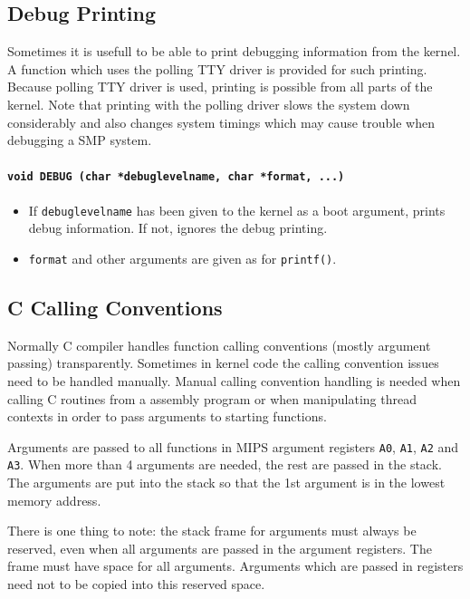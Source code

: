 \documentclass[twoside,a4paper]{report}
\makeatletter
\newenvironment{function}[3]{%
\paragraph{\texttt{#1 {\textbf{#2}} (#3)}}%
\index{#2@\texttt{#2}}%
\begin{itemize}%
}{%
\end{itemize}%
}
\makeatother
\begin{document}
\subsection{Debug Printing}


Sometimes it is usefull to be able to print debugging information from
the kernel. A function which uses the polling TTY driver is provided
for such printing. Because polling TTY driver is used, printing is
possible from all parts of the kernel. Note that printing with the
polling driver slows the system down considerably and also changes
system timings which may cause trouble when debugging a SMP system.

\begin{function}{void}{DEBUG}{char *debuglevelname, char *format, ...}

\item If \texttt{debuglevelname} has been given to the kernel as a boot
argument, prints debug information. If not, ignores the debug printing.

\item \texttt{format} and other arguments are given as for \texttt{printf()}.

\end{function}


\subsection{C Calling Conventions}
\label{callingconvention}


Normally C compiler handles function calling conventions (mostly
argument passing) transparently. Sometimes in kernel code the calling
convention issues need to be handled manually. Manual calling
convention handling is needed when calling C routines from a assembly
program or when manipulating thread contexts in order to pass
arguments to starting functions.

Arguments are passed to all functions in MIPS argument registers
\texttt{A0}, \texttt{A1}, \texttt{A2} and \texttt{A3}. When more than
4 arguments are needed, the rest are passed in the stack. The
arguments are put into the stack so that the 1st argument is in the
lowest memory address.

There is one thing to note: the stack frame for arguments must always
be reserved, even when all arguments are passed in the argument
registers. The frame must have space for all arguments. Arguments
which are passed in registers need not to be copied into this reserved
space.
\end{document}
